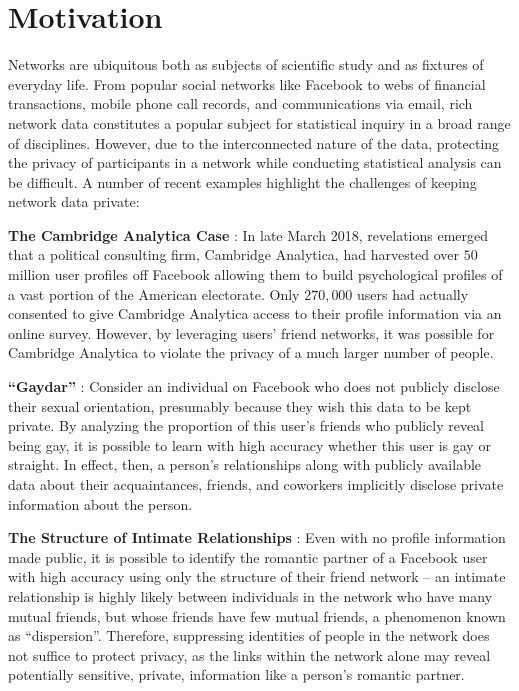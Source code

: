 \section{Motivation}

Networks are ubiquitous both as subjects of scientific study and as fixtures of everyday life. From popular social networks like Facebook to webs of financial transactions, mobile phone call records, and communications via email, rich network data constitutes a popular subject for statistical inquiry in a broad range of disciplines. However, due to the interconnected nature of the data, protecting the privacy of participants in a network while conducting statistical analysis can be difficult. A number of recent examples highlight the challenges of keeping network data private:

\textbf{The Cambridge Analytica Case} \cite{nytimes}:
In late March 2018, revelations emerged that a political consulting firm, Cambridge Analytica, had harvested over $50$ million user profiles off Facebook allowing them to build psychological profiles of a vast portion of the American electorate. Only $270,000$ users had actually consented to give Cambridge Analytica access to their profile information via an online survey. However, by leveraging users' friend networks, it was possible for Cambridge Analytica to violate the privacy of a much larger number of people. 


\textbf{``Gaydar''} \cite{JM09}:
Consider an individual on Facebook who does not publicly disclose their sexual orientation, presumably because they wish this data to be kept private. By analyzing the proportion of this user's friends who publicly reveal being gay, it is possible to learn with high accuracy whether this user is gay or straight. In effect, then, a person's relationships along with publicly available data about their acquaintances, friends, and coworkers implicitly disclose private information about the person. 

\textbf{The Structure of Intimate Relationships} \cite{BK14}:
Even with no profile information made public, it is possible to identify the romantic partner of a Facebook user with high accuracy using only the structure of their friend network -- an intimate relationship is highly likely between individuals in the network who have many mutual friends, but whose friends have few mutual friends, a phenomenon known as ``dispersion''. Therefore, suppressing identities of people in the network does not suffice to protect privacy, as the links within the network alone may reveal potentially sensitive, private, information like a person's romantic partner.  

